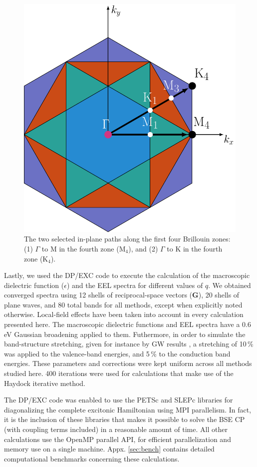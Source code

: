 \documentclass[aps,prb,10pt,showpacs,superscriptaddress,twocolumn,notitlepage]{revtex4-1}
\begin{document}
\begin{figure}[t]
\centering
\includegraphics[width=0.6\linewidth]{fig01}
\caption{The two selected in-plane paths along the first four Brillouin zones:
(1) $\Gamma$ to M in the fourth zone (M$_{4}$), and (2) $\Gamma$ to K in the
fourth zone (K$_{4}$).}
\label{fig:brillouin}
\end{figure}

Lastly, we used the DP/EXC code \cite{olevanoDP, reiningEXC} to execute the
calculation of the macroscopic dielectric function ($\epsilon$) and the EEL
spectra for different values of $q$. We obtained converged spectra using 12
shells of reciprocal-space vectors ($\mathbf{G}$), 20 shells of plane waves, and
80 total bands for all methods, except when explicitly noted otherwise.
Local-field effects have been taken into account in every calculation presented
here. The macroscopic dielectric functions and EEL spectra have a 0.6 eV
Gaussian broadening applied to them. Futhermore, in order to simulate the
band-structure stretching, given for instance by GW results \cite{olevano}, a
stretching of 10\,\% was applied to the valence-band energies, and 5\,\% to the
conduction band energies. These parameters and corrections were kept uniform
across all methods studied here. 400 iterations were used for calculations that
make use of the Haydock iterative method.

The DP/EXC code was enabled to use the PETSc \cite{petsc} and SLEPc
\cite{hernandezTOMS05} libraries for diagonalizing \cite{reshetnyakthesis} the
complete excitonic Hamiltonian using MPI parallelism. In fact, it is the
inclusion of these libraries that makes it possible to solve the BSE CP (with
coupling terms included) in a reasonable amount of time. All other calculations
use the OpenMP parallel API, for efficient parallelization and memory use on a
single machine. Appx. \ref{sec:bench} contains detailed computational benchmarks
concerning these calculations.
\end{document}
